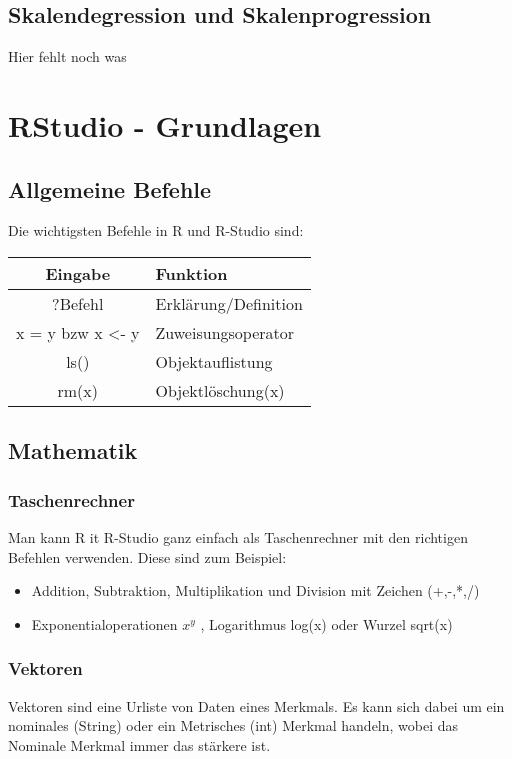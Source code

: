 \documentclass[a4paper,10pt]{scrartcl}
\begin{document}
\subsection{Skalendegression und Skalenprogression}
 Hier fehlt noch was

\newpage
\section{RStudio - Grundlagen }
\subsection{Allgemeine Befehle}
Die wichtigsten Befehle in R und R-Studio sind:
\begin{table}[!htp]
    \centering
    \begin{tabular}{|c|l|}\hline
Eingabe&Funktion\\\hline
?Befehl&Erklärung/Definition\\\hline
x = y bzw x <- y&Zuweisungsoperator\\\hline
ls()&Objektauflistung\\\hline
rm(x)&Objektlöschung(x)\\\hline
    \end{tabular}
    \label{tab:my_label}
\end{table}
\subsection{Mathematik}
\subsubsection{Taschenrechner}
Man kann R it R-Studio ganz einfach als Taschenrechner mit den richtigen Befehlen verwenden. Diese sind zum Beispiel: \newline
\begin{itemize}
    \item Addition, Subtraktion, Multiplikation und Division mit Zeichen (+,-,*,/)
    \item Exponentialoperationen $x^y$ , Logarithmus log(x) oder Wurzel sqrt(x) 
    
\end{itemize}
\subsubsection{Vektoren}
Vektoren sind eine Urliste von Daten eines Merkmals. Es kann sich dabei um ein nominales (String) oder ein Metrisches (int) Merkmal handeln, wobei das Nominale Merkmal immer das stärkere ist.
\end{document}
